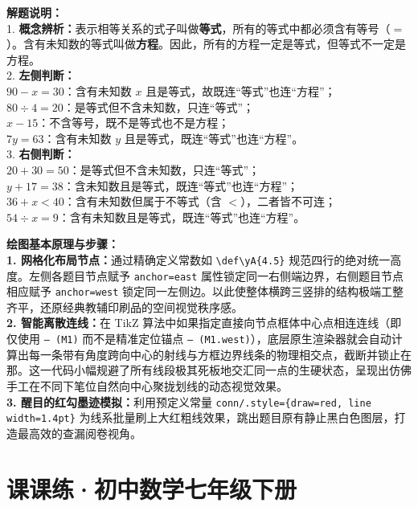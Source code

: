 \documentclass[12pt, a4paper]{ctexrep}
\begin{document}
\vspace{0.6cm}

{\small\color{gray}
\textbf{解题说明：}\\
1. \textbf{概念辨析：}表示相等关系的式子叫做\textbf{等式}，所有的等式中都必须含有等号（$=$）。含有未知数的等式叫做\textbf{方程}。因此，所有的方程一定是等式，但等式不一定是方程。\\
2. \textbf{左侧判断：}\\
\quad $90-x=30$：含有未知数 $x$ 且是等式，故既连“等式”也连“方程”；\\
\quad $80\div4=20$：是等式但不含未知数，只连“等式”；\\
\quad $x-15$：不含等号，既不是等式也不是方程；\\
\quad $7y=63$：含有未知数 $y$ 且是等式，既连“等式”也连“方程”。\\
3. \textbf{右侧判断：}\\
\quad $20+30=50$：是等式但不含未知数，只连“等式”；\\
\quad $y+17=38$：含未知数且是等式，既连“等式”也连“方程”；\\
\quad $36+x<40$：含有未知数但属于不等式（含 $<$），二者皆不可连；\\
\quad $54\div x=9$：含有未知数且是等式，既连“等式”也连“方程”。
}

\vspace{0.6cm}

{\small\color{blue!70!black}
\textbf{绘图基本原理与步骤：}\\
\textbf{1. 网格化布局节点：}通过精确定义常数如 \texttt{\textbackslash def\textbackslash yA\{4.5\}} 规范四行的绝对统一高度。左侧各题目节点赋予 \texttt{anchor=east} 属性锁定同一右侧端边界，右侧题目节点相应赋予 \texttt{anchor=west} 锁定同一左侧边。以此使整体横跨三竖排的结构极端工整齐平，还原经典教辅印刷品的空间视觉秩序感。\\
\textbf{2. 智能离散连线：}在 TikZ 算法中如果指定直接向节点框体中心点相连连线（即仅使用 \texttt{-- (M1)} 而不是精准定位锚点 \texttt{-- (M1.west)}），底层原生渲染器就会自动计算出每一条带有角度跨向中心的射线与方框边界线条的物理相交点，截断并锁止在那。这一代码小幅规避了所有线段极其死板地交汇同一点的生硬状态，呈现出仿佛手工在不同下笔位自然向中心聚拢划线的动态视觉效果。\\
\textbf{3. 醒目的红勾墨迹模拟：}利用预定义常量 \texttt{conn/.style=\{draw=red, line width=1.4pt\}} 为线系批量刷上大红粗线效果，跳出题目原有静止黑白色图层，打造最高效的查漏阅卷视角。
}


\chapter{课课练·初中数学七年级下册}
\end{document}
